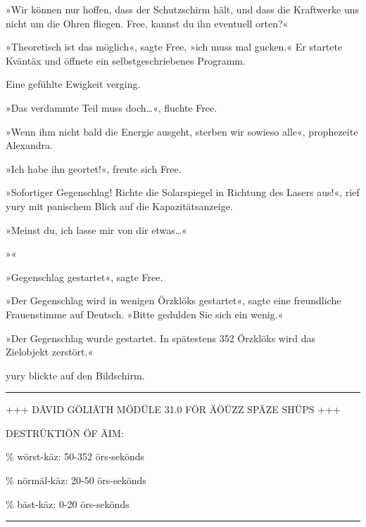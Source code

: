 
»Wir können nur hoffen, dass der Schutzschirm hält, und dass die Kraftwerke uns nicht um die Ohren fliegen. Free, kannst du ihn eventuell orten?«

»Theoretisch ist das möglich«, sagte Free, »ich muss mal gucken.« Er startete Kväntäx und öffnete ein selbstgeschriebenes Programm.

Eine gefühlte Ewigkeit verging.


»Das verdammte Teil muss doch…«, fluchte Free.

»Wenn ihm nicht bald die Energie ausgeht, sterben wir sowieso alle«, prophezeite Alexandra.


»Ich habe ihn geortet!«, freute sich Free.

»Sofortiger Gegenschlag! Richte die Solarspiegel in Richtung des Lasers aus!«, rief yury mit panischem Blick auf die Kapazitätsanzeige.

»Meinst du, ich lasse mir von dir etwas…«

»«

»Gegenschlag gestartet«, sagte Free.

»Der Gegenschlag wird in wenigen Örzklöks gestartet«, sagte eine freundliche Frauenstimme auf Deutsch. »Bitte gedulden Sie sich ein wenig.«


»Der Gegenschlag wurde gestartet. In spätestens 352 Örzklöks wird das Zielobjekt zerstört.«

yury blickte auf den Bildschirm.

\noindent \parbox{\textwidth}{ \vspace{3ex} \hrule \vspace{3ex}

    \begin{footnotesize}
    \begin{ttfamily}

\noindent +++ DÄVID GÖLIÄTH MÖDÜLE 31.0 FÖR ÄÖÜZZ SPÄZE SHÜPS +++

\noindent DESTRÜKTIÖN ÖF ÄIM:

 \% wörst-käz: 50-352 örs-sekönds

 \% nörmäl-käz: 20-50 örs-sekönds

 \% bäst-käz: 0-20 örs-sekönds

    \end{ttfamily}
    \end{footnotesize}

\vspace{3ex} \hrule \vspace{3ex} }


